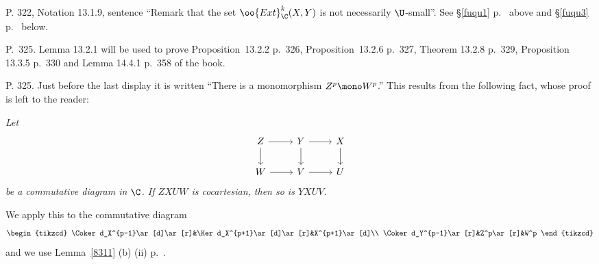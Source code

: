 \documentclass[12pt]{article}
\theoremstyle{remark}
\theoremstyle{definition}
\begin{document}
%

\begin{s}
P. 322, Notation 13.1.9, sentence ``Remark that the set $\oo{Ext}^k_\C(X,Y)$ is not necessarily $\U$-small''. See \S\ref{fuqu1} p.~ above and \S\ref{fuqu3} p.~ below.
\end{s}



\begin{s} 
P.~325. Lemma 13.2.1 will be used to prove Proposition~13.2.2 p.~326, Proposition~13.2.6 p.~327, Theorem 13.2.8 p.~329, Proposition 13.3.5 p.~330 and Lemma 14.4.1 p.~358 of the book. 
\end{s}

%

\begin{s}
P. 325. Just before the last display it is written ``There is a monomorphism $Z^p\mono W^p$.'' This results from the following fact, whose proof is left to the reader:

\nn\emph{Let}  
$$
\begin{tikzcd}
Z\ar[d]\ar[r]&Y\ar[d]\ar[r]&X\ar[d]\\ 
W\ar[r]&V\ar[r]&U
\end{tikzcd}
$$ 
\emph{be a commutative diagram in $\C$. If $ZXUW$ is cocartesian, then so is $YXUV$.}

We apply this to the commutative diagram 
$$
\begin{tikzcd}
\Coker d_X^{p-1}\ar[d]\ar[r]&\Ker d_X^{p+1}\ar[d]\ar[r]&X^{p+1}\ar[d]\\ 
\Coker d_Y^{p-1}\ar[r]&Z^p\ar[r]&W^p
\end{tikzcd}
$$ 
and we use Lemma~\ref{8311} (b) (ii) p.~.
\end{s}

%
\end{document}
